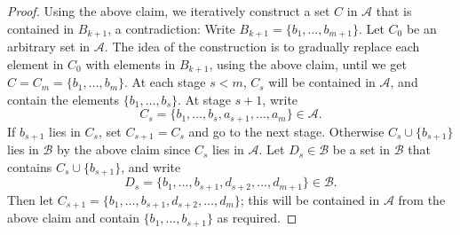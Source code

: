 \documentclass{article}
\begin{document}
\begin{enumerate}
\begin{enumerate}
\begin{proof}
          Using the above claim, we iteratively construct a set $C$ in
          $\mathcal{A}$ that is contained in $B_{k+1}$, a contradiction:
          Write $B_{k+1}=\{b_1,\ldots,b_{m+1}\}$. Let $C_0$ be an arbitrary
          set in $\mathcal{A}$. The idea of the construction is to
          gradually replace each element in $C_0$ with elements in
          $B_{k+1}$, using the above claim, until we get
          $C=C_m=\{b_1,\ldots,b_m\}$. At each stage $s<m$, $C_s$ will be
          contained in $\mathcal{A}$, and contain the elements
          $\{b_1,\ldots,b_s\}$. At stage $s+1$, write
          \[C_s=\{b_1,\ldots,b_s,a_{s+1},\ldots,a_m\} \in\mathcal{A}.\]
          If $b_{s+1}$ lies in $C_s$, set $C_{s+1}=C_s$ and go to the next
          stage. Otherwise $C_s\cup\{b_{s+1}\}$ lies in $\mathcal{B}$ by
          the above claim since $C_s$ lies in $\mathcal{A}$. Let
          $D_s\in\mathcal{B}$ be a set in $\mathcal{B}$ that contains
          $C_s\cup\{b_{s+1}\}$, and write
          \[D_s=\{b_1,\ldots,b_{s+1},d_{s+2},\ldots,d_{m+1}\}
          \in\mathcal{B}.\]
          Then let $C_{s+1}=\{b_1,\ldots,b_{s+1},d_{s+2},\ldots,d_{m}\}$;
          this will be contained in $\mathcal{A}$ from the above claim and
          contain $\{b_1,\ldots,b_{s+1}\}$ as required.
          
        \end{proof}
    \end{enumerate}
\end{enumerate}
\end{document}
